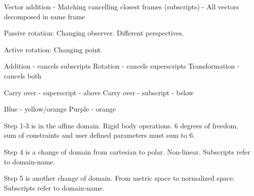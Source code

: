

\makeatletter
\let\@seccntformat\@oldseccntformat
\let\subsubsection\oldsubsubsection
\makeatother

Vector addition
- Matching cancelling closest frames (subscripts)
- All vectors decomposed in same frame

Passive rotation:
Changing observer. Different perspectives. 

Active rotation:
Changing point.


Addition - cancels subscripts
Rotation - cancels superscripts
Transformation - cancels both

Carry over - superscript - above
Carry over - subscript - below

Blue - yellow/orange
Purple - orange

Step 1-3 is in the affine domain. Rigid body operations. 6 degrees of freedom, sum of constraints and user defined parameters must sum to 6.

Step 4 is a change of domain from cartesian to polar. Non-linear. Subscripts refer to domain-name.

Step 5 is another change of domain. From metric space to normalized space. Subscripts refer to domain-name.

